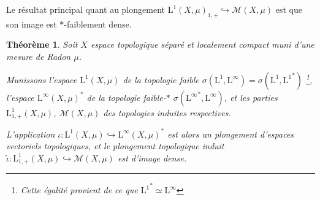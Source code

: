 \documentclass[a4paper,12pt]{article}
\newtheorem{theorem}{Théorème}[section]
\begin{document}
Le résultat principal quant au plongement $\mathrm{L}^1(X, \mu)_{1, +}\hookrightarrow \mathcal{M}(X, \mu)$ est que son image est $*$-faiblement dense.

\begin{theorem}\label{dense_in_means}
    Soit $X$ espace topologique séparé et localement compact muni d'une mesure de Radon $\mu$.

    Munissons l'espace $\mathrm{L}^1(X,\mu)$ de la topologie faible $\sigma(\mathrm{L}^1, \mathrm{L}^\infty) = \sigma\left(\mathrm{L}^1, {\mathrm{L}^1}^*\right)$
    \footnote{Cette égalité provient de ce que ${\mathrm{L}^1}^*\simeq\mathrm{L}^\infty$}, 
    l'espace $\mathrm{L}^\infty(X,\mu)^*$ de la topologie faible-$*$ $\sigma({\mathrm{L}^\infty}^*, \mathrm{L}^\infty)$,
    et les parties $\mathrm{L}^1_{1, +}(X, \mu)$, $\mathcal{M}(X, \mu)$ des topologies induites respectives.

    L'application $\iota:\mathrm{L}^1(X,\mu)\hookrightarrow\mathrm{L}^\infty(X,\mu)^*$ est alors un plongement d'espaces 
    vectoriels topologiques, et le plongement topologique induit $\widetilde{\iota}:\mathrm{L}^1_{1, +}(X, \mu)\hookrightarrow \mathcal{M}(X, \mu)$
    est d'image dense. 
\end{theorem}
\end{document}
